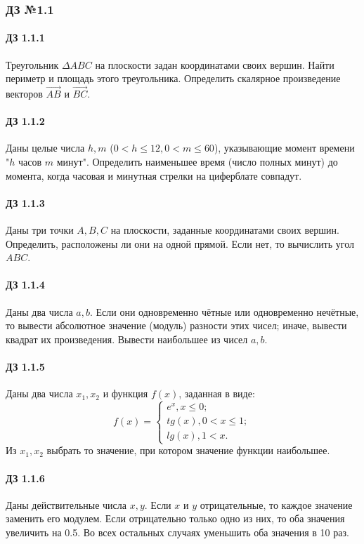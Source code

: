\documentclass[12pt,a4paper]{report}
\begin{document}
\clearpage
\subsubsection*{ДЗ №1.1}
\paragraph*{ДЗ 1.1.1} Треугольник $\Delta ABC$ на плоскости задан координатами своих вершин. Найти периметр и площадь этого треугольника. Определить скалярное произведение векторов $\overrightarrow{AB}$ и $\overrightarrow{BC}$.
\paragraph*{ДЗ 1.1.2} Даны целые числа $h,m$ ($0 < h \le 12, 0 < m \le 60$), указывающие момент времени "$h$ часов $m$ минут". Определить наименьшее время (число полных минут) до момента, когда часовая и минутная стрелки на циферблате совпадут.
\paragraph*{ДЗ 1.1.3} Даны три точки $A, B, C$ на плоскости, заданные координатами своих вершин. Определить, расположены ли они на одной прямой. Если нет, то вычислить угол $ABC$.
\paragraph*{ДЗ 1.1.4} Даны два числа $a, b$. Если они одновременно чётные или одновременно нечётные, то вывести абсолютное значение (модуль) разности этих чисел; иначе, вывести квадрат их произведения. Вывести наибольшее из чисел $a, b$.
\paragraph*{ДЗ 1.1.5} Даны два числа $x_1, x_2$ и функция $f(x)$, заданная в виде:
\begin{equation*}
 f(x) = 
 \begin{cases}
   e^x, x \le 0; \\
   tg(x), 0 < x \le 1; \\
   lg(x), 1 < x.
 \end{cases}
\end{equation*}
Из $x_1, x_2$ выбрать то значение, при котором значение функции наибольшее.
\paragraph*{ДЗ 1.1.6} Даны действительные числа $x, y$. Если $x$ и $y$ отрицательные, то каждое значение заменить его модулем. Если отрицательно только одно из них, то оба значения увеличить на 0.5. Во всех остальных случаях уменьшить оба значения в 10 раз.
\end{document}
